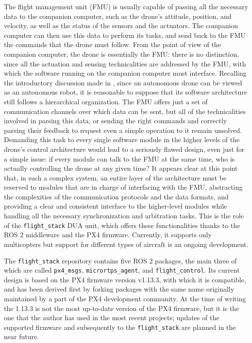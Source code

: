 The flight management unit (FMU) is usually capable of passing all the necessary data to the companion computer, such as the drone's attitude, position, and velocity, as well as the status of the sensors and the actuators. The companion computer can then use this data to perform its tasks, and send back to the FMU the commands that the drone must follow. From the point of view of the companion computer, the drone is essentially the FMU: there is no distinction, since all the actuation and sensing technicalities are addressed by the FMU, with which the software running on the companion computer must interface. Recalling the introductory discussion made in , since an autonomous drone can be viewed as an autonomous robot, it is reasonable to suppose that its software architecture still follows a hierarchical organization. The FMU offers just a set of communication channels over which data can be sent, but all of the technicalities involved in parsing this data, or sending the right commands and correctly parsing their feedback to request even a simple operation to it remain unsolved. Demanding this task to every single software module in the higher levels of the drone's control architecture would lead to a seriously flawed design, even just for a simple issue: if every module can talk to the FMU at the same time, who is actually controlling the drone at any given time? It appears clear at this point that, in such a complex system, an entire layer of the architecture must be reserved to modules that are in charge of interfacing with the FMU, abstracting the complexities of the communication protocols and the data formats, and providing a clear and consistent interface to the higher-level modules while handling all the necessary synchronization and arbitration tasks. This is the role of the \texttt{flight\_stack} \cite{masocco_flight_stack_nodate} DUA unit, which offers these functionalities thanks to the ROS 2 middleware and the PX4 firmware. Currently, it supports only multicopters but support for different types of aircraft is an ongoing development.

The \texttt{flight\_stack} repository contains five ROS 2 packages, the main three of which are called \texttt{px4\_msgs}, \texttt{micrortps\_agent}, and \texttt{flight\_control}. Its current design is based on the PX4 firmware version v1.13.3, with which it is compatible, and has been derived first by forking packages with the same name originally maintained by a part of the PX4 development community. At the time of writing the 1.13.3 is not the most up-to-date version of the PX4 firmware, but it is the one that the author has used in the most recent projects; updates of the supported firmware and subsequently to the \texttt{flight\_stack} are planned in the near future.

